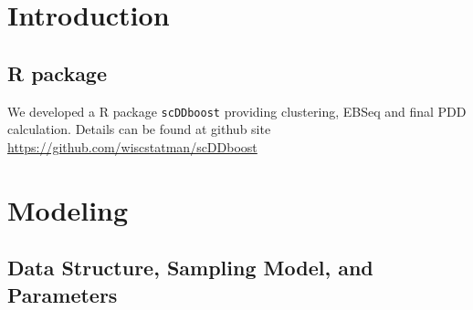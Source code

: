 \documentclass[aoas,preprint]{imsart}
\begin{document}
\clearpage

\section{Introduction}





\subsection{R package}

We developed a R package \texttt{scDDboost} providing clustering, EBSeq and final PDD calculation. 
Details can be found at github site \url {https://github.com/wiscstatman/scDDboost}



\section{Modeling}

\subsection{Data Structure, Sampling Model, and Parameters}
\end{document}
